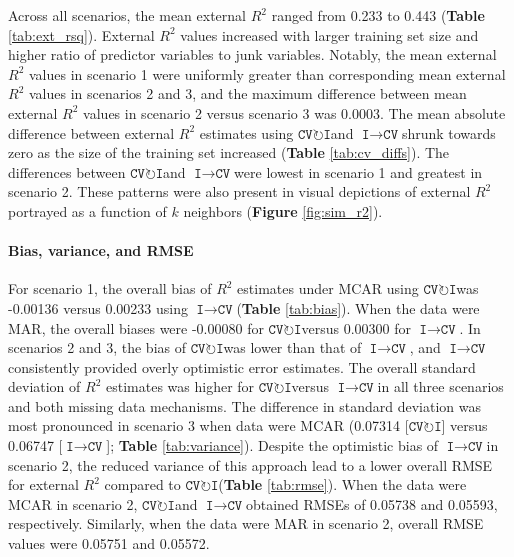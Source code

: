 \documentclass[AMA,STIX1COL,doublespace]{WileyNJD-v2}
\begin{document}
Across all scenarios, the mean external \(R^2\) ranged from 0.233 to
0.443 (\textbf{Table} \ref{tab:ext_rsq}). External \(R^2\) values
increased with larger training set size and higher ratio of predictor
variables to junk variables. Notably, the mean external \(R^2\) values
in scenario 1 were uniformly greater than corresponding mean external
\(R^2\) values in scenarios 2 and 3, and the maximum difference between
mean external \(R^2\) values in scenario 2 versus scenario 3 was 0.0003.
The mean absolute difference between external \(R^2\) estimates using
$\texttt{CV}\!\circlearrowright\!\texttt{I}$\space and
$\texttt{I}\!\!\rightarrow\!\texttt{CV}$\space shrunk towards zero as
the size of the training set increased (\textbf{Table}
\ref{tab:cv_diffs}). The differences between
$\texttt{CV}\!\circlearrowright\!\texttt{I}$\space and
$\texttt{I}\!\!\rightarrow\!\texttt{CV}$\space were lowest in scenario 1
and greatest in scenario 2. These patterns were also present in visual
depictions of external \(R^2\) portrayed as a function of \(k\)
neighbors (\textbf{Figure} \ref{fig:sim_r2}).

\paragraph{Bias, variance, and RMSE}

For scenario 1, the overall bias of \(R^2\) estimates under MCAR using
$\texttt{CV}\!\circlearrowright\!\texttt{I}$\space was -0.00136 versus
0.00233 using
$\texttt{I}\!\!\rightarrow\!\texttt{CV}$\space (\textbf{Table}
\ref{tab:bias}). When the data were MAR, the overall biases were
-0.00080 for $\texttt{CV}\!\circlearrowright\!\texttt{I}$\space versus
0.00300 for $\texttt{I}\!\!\rightarrow\!\texttt{CV}$\space. In scenarios
2 and 3, the bias of
$\texttt{CV}\!\circlearrowright\!\texttt{I}$\space was lower than that
of $\texttt{I}\!\!\rightarrow\!\texttt{CV}$\space, and
$\texttt{I}\!\!\rightarrow\!\texttt{CV}$\space consistently provided
overly optimistic error estimates. The overall standard deviation of
\(R^2\) estimates was higher for
$\texttt{CV}\!\circlearrowright\!\texttt{I}$\space versus
$\texttt{I}\!\!\rightarrow\!\texttt{CV}$\space in all three scenarios
and both missing data mechanisms. The difference in standard deviation
was most pronounced in scenario 3 when data were MCAR (0.07314
{[}$\texttt{CV}\!\circlearrowright\!\texttt{I}${]} versus 0.06747
{[}$\texttt{I}\!\!\rightarrow\!\texttt{CV}${]}; \textbf{Table}
\ref{tab:variance}). Despite the optimistic bias of
$\texttt{I}\!\!\rightarrow\!\texttt{CV}$\space in scenario 2, the
reduced variance of this approach lead to a lower overall RMSE for
external \(R^2\) compared to
$\texttt{CV}\!\circlearrowright\!\texttt{I}$\space (\textbf{Table}
\ref{tab:rmse}). When the data were MCAR in scenario 2,
$\texttt{CV}\!\circlearrowright\!\texttt{I}$\space and
$\texttt{I}\!\!\rightarrow\!\texttt{CV}$\space obtained RMSEs of 0.05738
and 0.05593, respectively. Similarly, when the data were MAR in scenario
2, overall RMSE values were 0.05751 and 0.05572.
\end{document}
